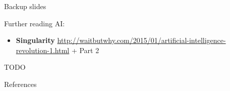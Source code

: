 \documentclass{beamer}
\newcommand{\todo}{\alert{TODO}}
\begin{document}

  \appendix

  \begin{frame}[standout]
    Backup slides
  \end{frame}

  \begin{frame}{Further reading}
    AI:
    \begin{itemize}
      \item \textbf{Singularity} \url{http://waitbutwhy.com/2015/01/artificial-intelligence-revolution-1.html} + Part 2
    \end{itemize}

    \todo
  \end{frame}

  \begin{frame}[allowframebreaks]{References}
    \tiny
    \printbibliography[heading=none]
  \end{frame}
\end{document}
